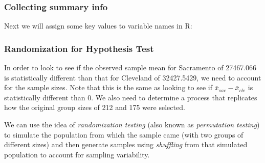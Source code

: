 \documentclass[]{tufte-book}
\newenvironment{Shaded}{\begin{snugshade}}{\end{snugshade}}
\newcommand{\DecValTok}[1]{\textcolor[rgb]{0.00,0.00,0.81}{{#1}}}
\newcommand{\StringTok}[1]{\textcolor[rgb]{0.31,0.60,0.02}{{#1}}}
\newcommand{\NormalTok}[1]{{#1}}
\theoremstyle{definition}
\theoremstyle{definition}
\theoremstyle{remark}
\begin{document}
\subsubsection{Collecting summary info}\label{collecting-summary-info-1}

Next we will assign some key values to variable names in R:

\begin{Shaded}
\end{Shaded}

\subsubsection{Randomization for Hypothesis
Test}\label{randomization-for-hypothesis-test-1}

In order to look to see if the observed sample mean for Sacramento of
27467.066 is statistically different than that for Cleveland of
32427.5429, we need to account for the sample sizes. Note that this is
the same as looking to see if \(\bar{x}_{sac} - \bar{x}_{cle}\) is
statistically different than 0. We also need to determine a process that
replicates how the original group sizes of 212 and 175 were selected.

We can use the idea of \emph{randomization testing} (also known as
\emph{permutation testing}) to simulate the population from which the
sample came (with two groups of different sizes) and then generate
samples using \emph{shuffling} from that simulated population to account
for sampling variability.
\end{document}
